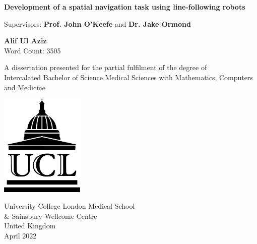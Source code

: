\documentclass{article}
\newcommand{\detailtexcount}[1]{%
  \immediate\write18{texcount -merge -sum -q #1.tex output.bbl > #1.wcdetail }%
}
\newcommand{\quickwordcount}[1]{%
  \immediate\write18{texcount -1 -sum -merge -q #1.tex output.bbl > #1-words.sum }%
   words%
}
\newcommand{\quickcharcount}[1]{%
  \immediate\write18{texcount -1 -sum -merge -char -q #1.tex output.bbl > #1-chars.sum }%
   characters (not including spaces)%
}
\begin{document}
\doublespacing

\begin{titlepage}
   \begin{center}
       \vspace*{0.5cm}
    \large
       \textbf{Development of a spatial navigation task using line-following robots}

       \vspace{0.5cm}
        Supervisors: \textbf{Prof. John O'Keefe} and \textbf{Dr. Jake Ormond}
            
       \vspace{1.5cm}

       \textbf{Alif Ul Aziz} \\
       Word Count: 3505
       \vfill
            
       A dissertation presented for the partial fulfilment of the degree of\\
       Intercalated Bachelor of Science Medical Sciences with Mathematics, Computers and Medicine
            
       \vspace{0.8cm}
     
       \includegraphics[width=0.3\textwidth]{images/ucl_logo.png}
    
        \vspace{1 cm}
       University College London Medical School \\ \& Sainsbury Wellcome Centre\\
       United Kingdom\\
       April 2022
            
   \end{center}
\end{titlepage}




\pagebreak
\end{document}
